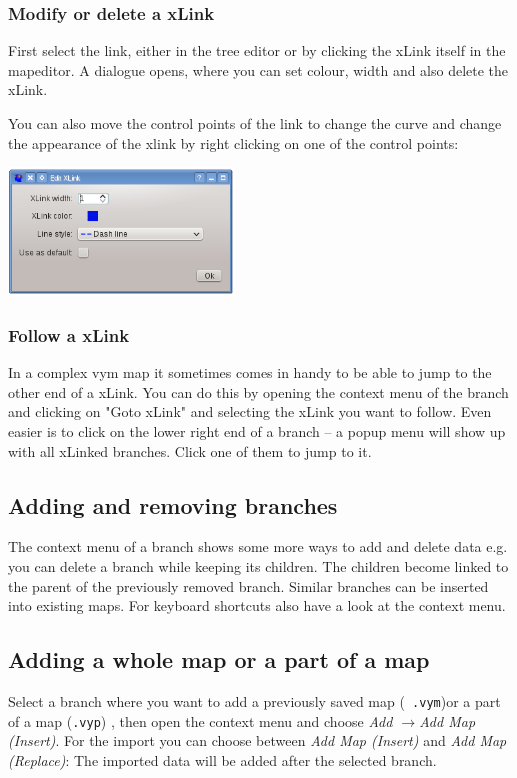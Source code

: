 \documentclass[12pt,a4paper]{article}
\newcommand{\vym}{{\sc vym }}
\newcommand{\ra}{$\longrightarrow$}
\begin{document}
\subsubsection*{Modify or delete a xLink}
First select the link, either in the tree editor or by clicking the xLink
itself in the mapeditor.  A dialogue opens, where you can set colour,
width and also delete the xLink.

You can also move the control points of the link to change the curve and
change the appearance of the xlink by right clicking on one of
the control points:
\begin{center}
\includegraphics[width=6cm]{images/xlink-property.png}
\end{center}


\subsubsection*{Follow a xLink}
In a complex \vym map it sometimes comes in handy to be able to jump to
the other end of a xLink. You can do this by opening the context menu of
the branch and clicking on "Goto xLink" and selecting the xLink you
want to follow. Even easier is to click on the lower right end of a
branch -- a popup menu will show up with all xLinked branches. Click one
of them to jump to it.


\subsection{Adding and removing branches}
The context menu of a branch shows some more ways to add and delete data
e.g. you can delete a branch while keeping its children. The children
become linked to the parent of the previously removed branch.  Similar
branches can be inserted into existing maps. For keyboard shortcuts also
have a look at the context menu.

\subsection{Adding a whole map or a part of a map}
Select a branch where you want to add a previously saved map ({\tt
.vym})or a part of a map ({\tt .vyp}) , then open the context menu and
choose {\em Add \ra Add Map (Insert)}. For the import you can choose
between {\em Add Map (Insert)} and {\em Add Map (Replace)}: The imported
data will be added after the selected branch.
\end{document}
